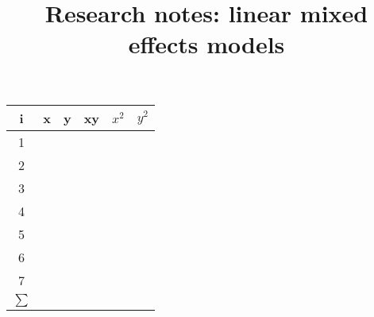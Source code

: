 \documentclass[12pt, a4paper]{article}
\title{Research notes: linear mixed effects models}
\author{ } \date{ }
\theoremstyle{plain}
\theoremstyle{definition}
\theoremstyle{remark}
\begin{document}
\begin{tabular}{|c||c|c||c|c|c|}
\hline \rule[-2ex]{0pt}{5.5ex} i & x & y & xy & $x^2$ & $y^2$   \\ 
\hline \rule[-2ex]{0pt}{5.5ex}1  &  &  &  &  &    \\ 
\hline \rule[-2ex]{0pt}{5.5ex}2  &  &  &  &  &    \\ 
\hline \rule[-2ex]{0pt}{5.5ex}3  &  &  &  &  &    \\ 
\hline \rule[-2ex]{0pt}{5.5ex}4  &  &  &  &  &    \\ 
\hline \rule[-2ex]{0pt}{5.5ex}5  &  &  &  &  &    \\ 
\hline \rule[-2ex]{0pt}{5.5ex}6  &  &  &  &  &    \\ 
\hline \rule[-2ex]{0pt}{5.5ex}7  &  &  &  &  &    \\ 
\hline \hline \rule[-2ex]{0pt}{5.5ex}$\sum$  &  &  &  &  &    \\
\hline 
\end{tabular} 
\end{document}
